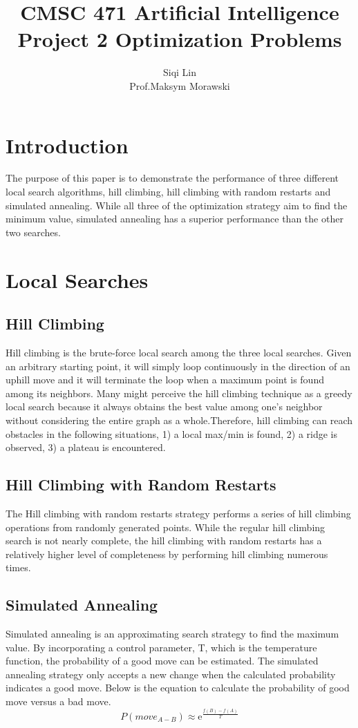 \documentclass[a4paper]{article}
\title{CMSC 471 Artificial Intelligence\\
	Project 2 Optimization Problems}
\author{Siqi Lin\\
	Prof.Maksym Morawski}
\begin{document}
\maketitle

\section{Introduction}

The purpose of this paper is to demonstrate the performance of three different local search algorithms, hill climbing, hill climbing with random restarts and simulated annealing. While all three of the optimization strategy aim to find the minimum value, simulated annealing has a superior performance than the other two searches.

\section{Local Searches}

\subsection{Hill Climbing}
Hill climbing is the brute-force local search among the three local searches. Given an arbitrary starting point, it will simply loop continuously in the direction of an uphill move and it will terminate the loop when a maximum point is found among its neighbors. Many might perceive the hill climbing technique as a greedy local search because it always obtains the best value among one's neighbor without considering the entire graph as a whole.Therefore, hill climbing can reach obstacles in the following situations, 1) a local max/min is found, 2) a ridge is observed, 3) a plateau is encountered.

\subsection{Hill Climbing with Random Restarts}
The Hill climbing with random restarts strategy performs a series of hill climbing operations from randomly generated points. While the regular hill climbing search is not nearly complete, the hill climbing with random restarts has a relatively higher level of completeness by performing hill climbing numerous times.  

\subsection{Simulated Annealing}
Simulated annealing is an approximating search strategy to find the maximum value. By incorporating a control parameter, T, which is the temperature function, the probability of a good move can be estimated. The simulated annealing strategy only accepts a new change when the calculated probability indicates a good move. Below is the equation to calculate the probability of good move versus a bad move.
$$P(move_{A-B}) \approx \mathrm{e}^{\frac{f(B)-f(A)}{T}}$$
\end{document}
